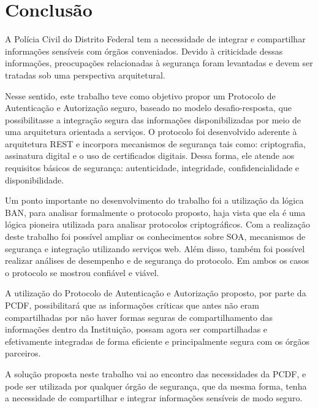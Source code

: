 \chapter{Conclusão}%

A Polícia Civil do Distrito Federal tem a necessidade de integrar e compartilhar informações sensíveis com órgãos conveniados. Devido à criticidade dessas informações, preocupações relacionadas à segurança foram levantadas e devem ser tratadas sob uma perspectiva arquitetural.

Nesse sentido, este trabalho teve como objetivo propor um Protocolo de Autenticação e Autorização seguro, baseado no modelo desafio-resposta, que possibilitasse a integração segura das informações disponibilizadas por meio de uma arquitetura orientada a serviços. O protocolo foi desenvolvido aderente à arquitetura REST e incorpora mecanismos de segurança tais como: criptografia, assinatura digital e o uso de certificados digitais. Dessa forma, ele atende aos requisitos básicos de segurança: autenticidade, integridade, confidencialidade e disponibilidade.

Um ponto importante no desenvolvimento do trabalho foi a utilização da lógica BAN, para analisar formalmente o protocolo proposto, haja vista que ela é uma lógica pioneira utilizada para analisar protocolos criptográficos. Com a realização deste trabalho foi possível ampliar os conhecimentos sobre SOA, mecanismos de segurança e integração utilizando serviços web. Além disso, também foi possível realizar análises de desempenho e de segurança do protocolo. Em ambos os casos o protocolo se mostrou confiável e viável.

A utilização do Protocolo de Autenticação e Autorização proposto, por parte da PCDF, possibilitará que as informações críticas que antes não eram compartilhadas por não haver formas seguras de compartilhamento das informações dentro da Instituição, possam agora ser compartilhadas e efetivamente integradas de forma eficiente e principalmente segura com os órgãos parceiros.

A solução proposta neste trabalho vai ao encontro das necessidades da PCDF, e pode ser utilizada por qualquer órgão de segurança, que da mesma forma, tenha a necessidade de compartilhar e integrar informações sensíveis de modo seguro.
